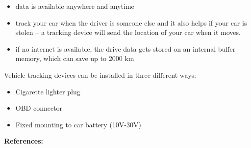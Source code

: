 \begin{singlespace}
\begin{itemize}
\item data is available anywhere and anytime
\item track your car when the driver is someone else and it also helps if your car is stolen – a tracking device will send the location of your car when it moves.
\item if no internet is available, the drive data gets stored on an internal buffer memory, which can save up to 2000 km
\end{itemize}
Vehicle tracking devices can be installed in three different ways:
\begin{itemize}
\item Cigarette lighter plug
\item OBD connector
\item Fixed mounting to car battery (10V-30V)
\end{itemize}
\textbf{References:} \cite{Maxtech}
\newpage


\end{singlespace}
